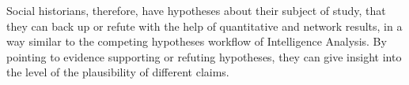 Social historians, therefore, have hypotheses about their subject of study, that they can back up or refute with the help of quantitative and network results, in a way similar to the competing hypotheses workflow of Intelligence Analysis\cite{dhamiAnalysisCompetingHypotheses2019}.
By pointing to evidence supporting or refuting hypotheses, they can give insight into the level of the plausibility of different claims.









